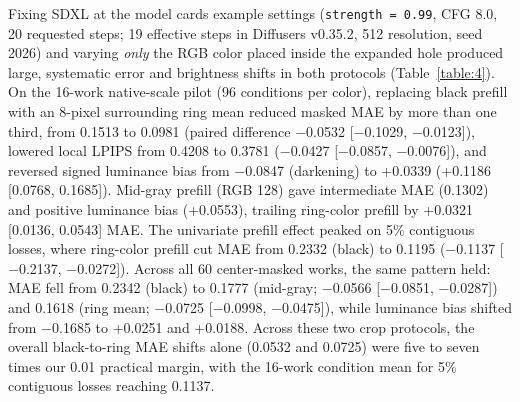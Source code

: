 \documentclass[applsci,article,submit,pdftex,moreauthors]{Definitions/mdpi}
\begin{document}
Fixing SDXL at the model card\textquotesingle s example settings (\texttt{strength\ =\ 0.99}, CFG 8.0, 20 requested steps; 19 effective steps in Diffusers v0.35.2, 512 resolution, seed 2026) and varying \emph{only} the RGB color placed inside the expanded hole produced large, systematic error and brightness shifts in both protocols (Table~\ref{table:4}). On the 16-work native-scale pilot (96 conditions per color), replacing black prefill with an 8-pixel surrounding ring mean reduced masked MAE by more than one third, from 0.1513 to 0.0981 (paired difference \ensuremath{-}0.0532 {[}\ensuremath{-}0.1029, \ensuremath{-}0.0123{]}), lowered local LPIPS from 0.4208 to 0.3781 (\ensuremath{-}0.0427 {[}\ensuremath{-}0.0857, \ensuremath{-}0.0076{]}), and reversed signed luminance bias from \ensuremath{-}0.0847 (darkening) to +0.0339 (+0.1186 {[}0.0768, 0.1685{]}). Mid-gray prefill (RGB 128) gave intermediate MAE (0.1302) and positive luminance bias (+0.0553), trailing ring-color prefill by +0.0321 {[}0.0136, 0.0543{]} MAE. The univariate prefill effect peaked on 5\% contiguous losses, where ring-color prefill cut MAE from 0.2332 (black) to 0.1195 (\ensuremath{-}0.1137 {[}\ensuremath{-}0.2137, \ensuremath{-}0.0272{]}). Across all 60 center-masked works, the same pattern held: MAE fell from 0.2342 (black) to 0.1777 (mid-gray; \ensuremath{-}0.0566 {[}\ensuremath{-}0.0851, \ensuremath{-}0.0287{]}) and 0.1618 (ring mean; \ensuremath{-}0.0725 {[}\ensuremath{-}0.0998, \ensuremath{-}0.0475{]}), while luminance bias shifted from \ensuremath{-}0.1685 to +0.0251 and +0.0188. Across these two crop protocols, the overall black-to-ring MAE shifts alone (0.0532 and 0.0725) were five to seven times our 0.01 practical margin, with the 16-work condition mean for 5\% contiguous losses reaching 0.1137.
\end{document}
